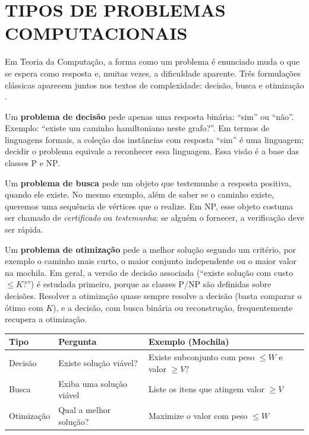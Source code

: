 \documentclass[
    12pt,
    oneside,
    a4paper,
    chapter=TITLE,
    section=TITLE,
    sumario=abnt-6027-2012
]{abntex2}
\renewcommand{\imprimircapa}{%
    \begin{capa}%
        \centering
        {\bfseries\large\MakeUppercase{\imprimirinstituicao}\par}
        \vspace*{2.2cm}

        {\bfseries\large\MakeUppercase{\imprimirautor}\par}
        \vfill

        {\bfseries\large\MakeUppercase{\imprimirtitulo}\par}
        \vfill

        {\bfseries\large\MakeUppercase{\imprimirlocal}\par}
        \vspace*{0.2cm}
        {\bfseries\large\MakeUppercase{\imprimirdata}\par}
    \end{capa}
}
\begin{document}
\OnehalfSpacing
{}
\imprimircapa
\sumario
\textual

\chapter{TIPOS DE PROBLEMAS COMPUTACIONAIS}
\label{cap:tipos}

Em Teoria da Computação, a forma como um problema é enunciado muda o que se espera como resposta e, muitas vezes, a dificuldade aparente. Três formulações clássicas aparecem juntos nos textos de complexidade: decisão, busca e otimização \cite{sipser,cormen}.

Um \textbf{problema de decisão} pede apenas uma resposta binária: ``sim'' ou ``não''. Exemplo: ``existe um caminho hamiltoniano neste grafo?''. Em termos de linguagens formais, a coleção das instâncias com resposta ``sim'' é uma linguagem; decidir o problema equivale a reconhecer essa linguagem. Essa visão é a base das classes P e NP.

Um \textbf{problema de busca} pede um objeto que testemunhe a resposta positiva, quando ele existe. No mesmo exemplo, além de saber se o caminho existe, queremos uma sequência de vértices que o realize. Em NP, esse objeto costuma ser chamado de \textit{certificado} ou \textit{testemunha}: se alguém o fornecer, a verificação deve ser rápida.

Um \textbf{problema de otimização} pede a melhor solução segundo um critério, por exemplo o caminho mais curto, o maior conjunto independente ou o maior valor na mochila. Em geral, a versão de decisão associada (``existe solução com custo $\leq K$?'') é estudada primeiro, porque as classes P/NP são definidas sobre decisões. Resolver a otimização quase sempre resolve a decisão (basta comparar o ótimo com $K$), e a decisão, com busca binária ou reconstrução, frequentemente recupera a otimização.

\begin{quadro}[!h]
    \centering
    \small
    \begin{tabular}{|p{2.6cm}|p{4.2cm}|p{5.4cm}|}
        \hline
        \textbf{Tipo} & \textbf{Pergunta} & \textbf{Exemplo (Mochila)} \\
        \hline
        Decisão & Existe solução viável? & Existe subconjunto com peso $\leq W$ e valor $\geq V$? \\
        \hline
        Busca & Exiba uma solução viável & Liste os itens que atingem valor $\geq V$ \\
        \hline
        Otimização & Qual a melhor solução? & Maximize o valor com peso $\leq W$ \\
        \hline
    \end{tabular}
\end{quadro}
\end{document}
